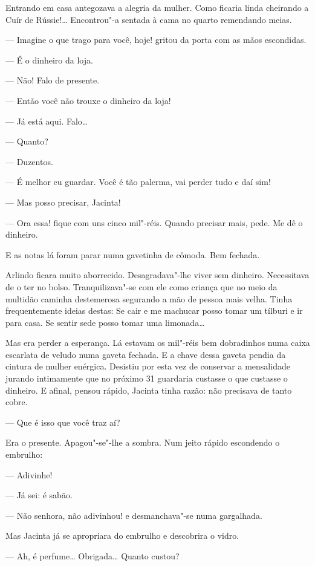 Entrando em casa antegozava a alegria da mulher. Como ficaria linda
cheirando a Cuír de Rússie!\ldots{} Encontrou"-a sentada à cama no quarto
remendando meias.

--- Imagine o que trago para você, hoje! gritou da porta com as mãos
escondidas.

--- É o dinheiro da loja.

--- Não! Falo de presente.

--- Então você não trouxe o dinheiro da loja!

--- Já está aqui. Falo\ldots{}

--- Quanto?

--- Duzentos.

--- É melhor eu guardar. Você é tão palerma, vai perder tudo e daí sim!

--- Mas posso precisar, Jacinta!

--- Ora essa! fique com uns cinco mil"-réis. Quando precisar mais, pede.
Me dê o dinheiro.

E as notas lá foram parar numa gavetinha de cômoda. Bem fechada.

Arlindo ficara muito aborrecido. Desagradava"-lhe viver sem dinheiro.
Necessitava de o ter no bolso. Tranquilizava"-se com ele como criança que
no meio da multidão caminha destemerosa segurando a mão de pessoa mais
velha. Tinha frequentemente ideias destas: Se cair e me machucar posso
tomar um tílburi e ir para casa. Se sentir sede posso tomar uma
limonada\ldots{}

Mas era perder a esperança. Lá estavam os mil"-réis bem dobradinhos numa
caixa escarlata de veludo numa gaveta fechada. E a chave dessa gaveta
pendia da cintura de mulher enérgica. Desistiu por esta vez de conservar
a mensalidade jurando intimamente que no próximo 31 guardaria custasse o
que custasse o dinheiro. E afinal, pensou rápido, Jacinta tinha razão:
não precisava de tanto cobre.

--- Que é isso que você traz aí?

Era o presente. Apagou"-se"-lhe a sombra. Num jeito rápido escondendo o
embrulho:

--- Adivinhe!

--- Já sei: é sabão.

--- Não senhora, não adivinhou! e desmanchava"-se numa gargalhada.

Mas Jacinta já se apropriara do embrulho e descobrira o vidro.

--- Ah, é perfume\ldots{} Obrigada\ldots{} Quanto custou?

